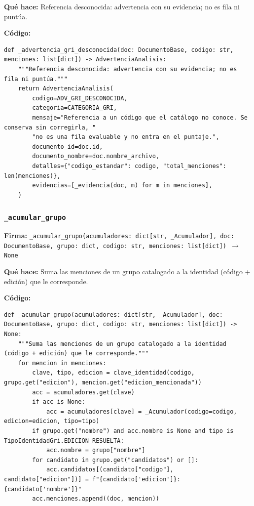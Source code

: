 \documentclass[11pt,a4paper]{article}
\begin{document}
\textbf{Qué hace:} Referencia desconocida: advertencia con su evidencia; no es fila ni puntúa.

\textbf{Código:}
\begin{lstlisting}
def _advertencia_gri_desconocida(doc: DocumentoBase, codigo: str, menciones: list[dict]) -> AdvertenciaAnalisis:
    """Referencia desconocida: advertencia con su evidencia; no es fila ni puntúa."""
    return AdvertenciaAnalisis(
        codigo=ADV_GRI_DESCONOCIDA,
        categoria=CATEGORIA_GRI,
        mensaje="Referencia a un código que el catálogo no conoce. Se conserva sin corregirla, "
        "no es una fila evaluable y no entra en el puntaje.",
        documento_id=doc.id,
        documento_nombre=doc.nombre_archivo,
        detalles={"codigo_estandar": codigo, "total_menciones": len(menciones)},
        evidencias=[_evidencia(doc, m) for m in menciones],
    )
\end{lstlisting}

\subsubsection*{\texttt{\_acumular\_grupo}}
\textbf{Firma:} \texttt{\_acumular\_grupo(acumuladores: dict[str, \_Acumulador], doc: DocumentoBase, grupo: dict, codigo: str, menciones: list[dict]) $\rightarrow$ None}

\textbf{Qué hace:} Suma las menciones de un grupo catalogado a la identidad (código + edición) que le corresponde.

\textbf{Código:}
\begin{lstlisting}
def _acumular_grupo(acumuladores: dict[str, _Acumulador], doc: DocumentoBase, grupo: dict, codigo: str, menciones: list[dict]) -> None:
    """Suma las menciones de un grupo catalogado a la identidad (código + edición) que le corresponde."""
    for mencion in menciones:
        clave, tipo, edicion = clave_identidad(codigo, grupo.get("edicion"), mencion.get("edicion_mencionada"))
        acc = acumuladores.get(clave)
        if acc is None:
            acc = acumuladores[clave] = _Acumulador(codigo=codigo, edicion=edicion, tipo=tipo)
        if grupo.get("nombre") and acc.nombre is None and tipo is TipoIdentidadGri.EDICION_RESUELTA:
            acc.nombre = grupo["nombre"]
        for candidato in grupo.get("candidatos") or []:
            acc.candidatos[(candidato["codigo"], candidato["edicion"])] = f"{candidato['edicion']}: {candidato['nombre']}"
        acc.menciones.append((doc, mencion))
\end{lstlisting}
\end{document}
